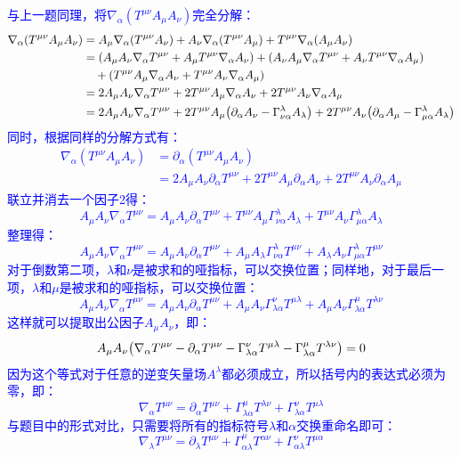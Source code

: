 \documentclass[a4paper]{article}
\begin{document}
\begin{enumerate}
    \textcolor{blue}{
    与上一题同理，将$\nabla_\alpha (T^{\mu\nu} A_\mu A_\nu)$完全分解：
    \begin{align*}
        \nabla_\alpha (T^{\mu\nu} A_\mu A_\nu)
        &= A_\mu \nabla_\alpha \qty(T^{\mu\nu} A_\nu) + A_\nu \nabla_\alpha \qty(T^{\mu\nu} A_\mu) + T^{\mu\nu} \nabla_\alpha \qty(A_\mu A_\nu) \\
        &= \qty(A_\mu A_\nu \nabla_\alpha T^{\mu\nu} + A_\mu T^{\mu\nu} \nabla_\alpha A_\nu) + \qty(A_\nu A_\mu \nabla_\alpha T^{\mu\nu} + A_\nu T^{\mu\nu} \nabla_\alpha A_\mu) \\
        &\quad + \qty(T^{\mu\nu} A_\mu \nabla_\alpha A_\nu + T^{\mu\nu} A_\nu \nabla_\alpha A_\mu) \\
        &= 2A_\mu A_\nu \nabla_\alpha T^{\mu\nu} + 2T^{\mu\nu} A_\mu \nabla_\alpha A_\nu + 2T^{\mu\nu} A_\nu \nabla_\alpha A_\mu \\
        &= 2A_\mu A_\nu \nabla_\alpha T^{\mu\nu} + 2T^{\mu\nu} A_\mu \qty(\partial_\alpha A_\nu - \Gamma^\lambda_{\nu\alpha} A_\lambda) + 2T^{\mu\nu} A_\nu \qty(\partial_\alpha A_\mu - \Gamma^\lambda_{\mu\alpha} A_\lambda)
    \end{align*}
    同时，根据同样的分解方式有：
    \begin{align*}
        \nabla_\alpha (T^{\mu\nu} A_\mu A_\nu)
        &= \partial_\alpha (T^{\mu\nu} A_\mu A_\nu) \\
        &= 2A_\mu A_\nu \partial_\alpha T^{\mu\nu} + 2T^{\mu\nu} A_\mu \partial_\alpha A_\nu + 2T^{\mu\nu} A_\nu \partial_\alpha A_\mu
    \end{align*}
    联立并消去一个因子2得：
    \[
        A_\mu A_\nu \nabla_\alpha T^{\mu\nu} = A_\mu A_\nu \partial_\alpha T^{\mu\nu} + T^{\mu\nu} A_\mu \Gamma^\lambda_{\nu\alpha} A_\lambda + T^{\mu\nu} A_\nu \Gamma^\lambda_{\mu\alpha} A_\lambda
    \]
    整理得：
    \[
        A_\mu A_\nu \nabla_\alpha T^{\mu\nu} = A_\mu A_\nu \partial_\alpha T^{\mu\nu} + A_\mu A_\lambda \Gamma^\lambda_{\nu\alpha} T^{\mu\nu} + A_\lambda A_\nu \Gamma^\lambda_{\mu\alpha} T^{\mu\nu}
    \]
    对于倒数第二项，$\lambda$和$\nu$是被求和的哑指标，可以交换位置；同样地，对于最后一项，$\lambda$和$\mu$是被求和的哑指标，可以交换位置：
    \[
        A_\mu A_\nu \nabla_\alpha T^{\mu\nu} = A_\mu A_\nu \partial_\alpha T^{\mu\nu} + A_\mu A_\nu \Gamma^\nu_{\lambda\alpha} T^{\mu\lambda} + A_\mu A_\nu \Gamma^\mu_{\lambda\alpha} T^{\lambda\nu}
    \]
    这样就可以提取出公因子$A_\mu A_\nu$，即：
    \[
        A_\mu A_\nu \qty(\nabla_\alpha T^{\mu\nu} - \partial_\alpha T^{\mu\nu} - \Gamma^\nu_{\lambda\alpha} T^{\mu\lambda} - \Gamma^\mu_{\lambda\alpha} T^{\lambda\nu}) = 0
    \]
    因为这个等式对于任意的逆变矢量场$A^\lambda$都必须成立，所以括号内的表达式必须为零，即：
    \[
        \nabla_\alpha T^{\mu\nu} = \partial_\alpha T^{\mu\nu} + \Gamma^\mu_{\lambda\alpha} T^{\lambda\nu} + \Gamma^\nu_{\lambda\alpha} T^{\mu\lambda}
    \]
    与题目中的形式对比，只需要将所有的指标符号$\lambda$和$\alpha$交换重命名即可：
    \[
        \nabla_\lambda T^{\mu\nu} = \partial_\lambda T^{\mu\nu} + \Gamma^\mu_{\alpha\lambda} T^{\alpha\nu} + \Gamma^\nu_{\alpha\lambda} T^{\mu\alpha}
    \]
    }

\end{enumerate}
\end{document}
